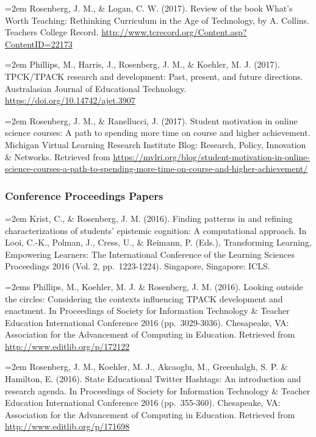 \documentclass[]{article}
\begin{document}
\hangindent=2em Rosenberg, J. M., \& Logan, C. W. (2017). Review of the
book What's Worth Teaching: Rethinking Curriculum in the Age of
Technology, by A. Collins. Teachers College Record.
\url{http://www.tcrecord.org/Content.asp?ContentID=22173}

\hangindent=2em Phillips, M., Harris, J., Rosenberg, J. M., \& Koehler,
M. J. (2017). TPCK/TPACK research and development: Past, present, and
future directions. Australasian Journal of Educational Technology.
\url{https://doi.org/10.14742/ajet.3907}

\hangindent=2em Rosenberg, J. M., \& Ranellucci, J. (2017). Student
motivation in online science courses: A path to spending more time on
course and higher achievement. Michigan Virtual Learning Research
Institute Blog: Research, Policy, Innovation \& Networks. Retrieved from
\url{https://mvlri.org/blog/student-motivation-in-online-science-courses-a-path-to-spending-more-time-on-course-and-higher-achievement/}

\hypertarget{conference-proceedings-papers}{%
\subsubsection{Conference Proceedings
Papers}\label{conference-proceedings-papers}}

\hangindent=2em Krist, C., \& Rosenberg, J. M. (2016). Finding patterns
in and refining characterizations of students' epistemic cognition: A
computational approach. In Looi, C.-K., Polman, J., Cress, U., \&
Reimann, P. (Eds.), Transforming Learning, Empowering Learners: The
International Conference of the Learning Sciences Proceedings 2016 (Vol.
2, pp.~1223-1224). Singapore, Singapore: ICLS.

\hangindent=2ems Phillips, M., Koehler, M. J. \& Rosenberg, J. M.
(2016). Looking outside the circles: Considering the contexts
influencing TPACK development and enactment. In Proceedings of Society
for Information Technology \& Teacher Education International Conference
2016 (pp.~3029-3036). Chesapeake, VA: Association for the Advancement of
Computing in Education. Retrieved from
\url{http://www.editlib.org/p/172122}

\hangindent=2em Rosenberg, J. M., Koehler, M. J., Akcaoglu, M.,
Greenhalgh, S. P. \& Hamilton, E. (2016). State Educational Twitter
Hashtags: An introduction and research agenda. In Proceedings of Society
for Information Technology \& Teacher Education International Conference
2016 (pp.~355-360). Chesapeake, VA: Association for the Advancement of
Computing in Education. Retrieved from
\url{http://www.editlib.org/p/171698}
\end{document}
